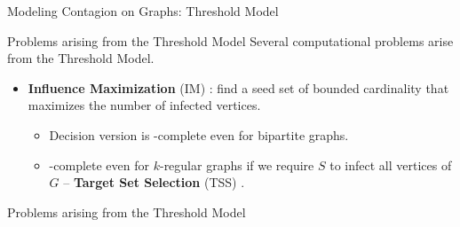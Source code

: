 \documentclass[10pt,aspectratio=169,english]{beamer}
\begin{document}
\begin{frame}{Modeling Contagion on Graphs: Threshold Model}
	\only<6>{
		\begin{figure}
			\centering
			\tikz \graph [spring layout, nodes={draw,circle}, horizontal=a to g] {
				a[fill=red, label=below:{\textcolor{red}{2}}] -- {b[fill=red, label=left:{\textcolor{red}{3}}], c[fill=red, label=above:{\textcolor{red}{1}}]};
				
				b -- {c, d[fill=red, label=below:{\textcolor{red}{1}}], e[fill=red, label=above:{\textcolor{red}{3}}]};
				d -- {[clique] e, f[fill=red, label=above:{\textcolor{red}{2}}], g[fill=red, label=below:{\textcolor{red}{2}}]};
			};
		\end{figure}
	}
\end{frame}

\begin{frame}{Problems arising from the Threshold Model}
	Several computational problems arise from the Threshold Model.
	\begin{itemize}
		\item<1-> \textbf{Influence Maximization} (\textsc{IM}) \parencite{kempe}: find a seed set of bounded cardinality that maximizes the number of infected vertices.
		\begin{itemize}
			\item<2-> Decision version is \NP-complete even for bipartite graphs.
			\item<3-> \NP-complete even for $k$-regular graphs if we require $S$ to infect all vertices of $G$ -- \textbf{Target Set Selection} (\textsc{TSS}) \parencite{DREYER2009}.
		\end{itemize}
	\end{itemize}
\end{frame}

\begin{frame}{Problems arising from the Threshold Model}
	
\end{frame}
\end{document}
